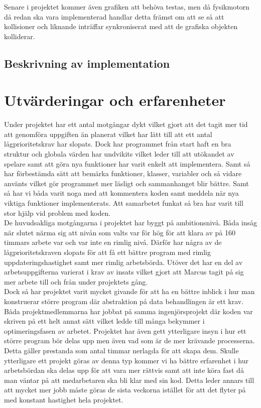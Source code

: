 \documentclass[12pt,a4paper]{article}
\begin{document}
Senare i projektet kommer även grafiken att behöva testas, men då fysikmotorn då redan ska vara implementerad handlar detta främst om att se så att kollisioner och liknande inträffar synkroniserat med att de grafiska objekten kolliderar. \\

\subsection{Beskrivning av implementation}



\section{Utvärderingar och erfarenheter}
    
Under projektet har ett antal motgångar dykt vilket gjort att det tagit mer tid att genomföra uppgiften än planerat vilket har lätt till att ett antal lågprioritetskrav har slopats. Dock har programmet från start haft en bra struktur och globala värden har undvikits vilket leder till att utökandet av spelare samt att göra nya funktioner har varit enkelt att implementera. Samt så har förbestämda sätt att bemärka funktioner, klasser, variabler och så vidare använts vilket gör programmet mer läsligt och sammanhanget blir bättre. Samt så har vi båda varit noga med att kommentera koden samt meddela när nya viktiga funktioner implementerats.  Att samarbetet funkat så bra har varit till stor hjälp vid problem med koden. \\

De huvudsakliga motgångarna i projektet har byggt på ambitionsnivå. Båda insåg när slutet närma sig att nivån som valts var för hög för att klara av på 160 timmars arbete var och var inte en rimlig nivå. Därför har några av de lågprioritetskraven slopats för att få ett bättre program med rimlig uppdateringshastighet samt mer rimlig arbetsbörda. Utöver det har en del av arbetsuppgifterna varierat i krav av insats vilket gjort att Marcus tagit på sig mer arbete till och från under projektets gång. \\

Dock så har projektet varit mycket givande för att ha en bättre inblick i hur man konstruerar större program där abstraktion på data behandlingen är ett krav. Båda projektmedlemmarna har jobbat på samma ingenjörsprojekt där koden var skriven på ett helt annat sätt vilket ledde till många bekymmer i optimeringsfasen av arbetet. Projektet har även gett ytterligare insyn i hur ett större program bör delas upp men även vad som är de mer krävande processerna. Detta gäller prestanda som antal timmar nerlagda för att skapa dem. Skulle ytterligare ett projekt göras av denna typ kommer vi ha bättre erfarenhet i hur arbetsbördan ska delas upp för att vara mer rättvis samt att inte köra fast då man väntar på att medarbetaren ska bli klar med sin kod. Detta leder annars till att mycket mer jobb måste göras de sista veckorna istället för att det flyter på med konstant hastighet hela projektet. \\
\end{document}
